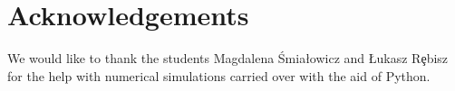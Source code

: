 \documentclass[reqno,10pt]{article}
\theoremstyle{definition}
\numberwithin{equation}{section}
\numberwithin{theorem}{section}
\begin{document}






\section{Acknowledgements}
We would like to thank the students Magdalena Śmiałowicz and Łukasz R\c{e}bisz for the help with numerical simulations carried over with the aid of Python.
\end{document}
